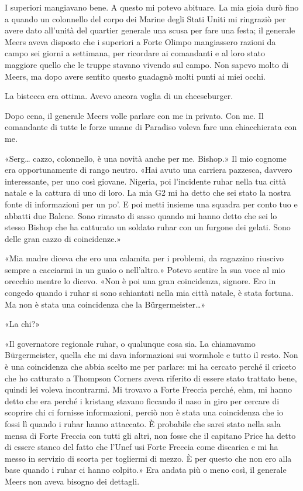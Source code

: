 I superiori mangiavano bene. A questo mi potevo abituare. La mia gioia
durò fino a quando un colonnello del corpo dei Marine degli Stati Uniti
mi ringraziò per avere dato all'unità del quartier generale una scusa
per fare una festa; il generale Meers aveva disposto che i superiori a
Forte Olimpo mangiassero razioni da campo sei giorni a settimana, per
ricordare ai comandanti e al loro stato maggiore quello che le truppe
stavano vivendo sul campo. Non sapevo molto di Meers, ma dopo avere
sentito questo guadagnò molti punti ai miei occhi.

La bistecca era ottima. Avevo ancora voglia di un cheeseburger.

\hfill\break

Dopo cena, il generale Meers volle parlare con me in privato. Con me. Il
comandante di tutte le forze umane di Paradiso voleva fare una
chiacchierata con me.

«Serg\ldots{} cazzo, colonnello, è una novità anche per me. Bishop.» Il
mio cognome era opportunamente di rango neutro. «Hai avuto una carriera
pazzesca, davvero interessante, per uno così giovane. Nigeria, poi
l'incidente ruhar nella tua città natale e la cattura di uno di loro. La
mia G2 mi ha detto che sei stato la nostra fonte di informazioni per un
po'. E poi metti insieme una squadra per conto tuo e abbatti due Balene.
Sono rimasto di sasso quando mi hanno detto che sei lo stesso Bishop che
ha catturato un soldato ruhar con un furgone dei gelati. Sono delle gran
cazzo di coincidenze.»

«Mia madre diceva che ero una calamita per i problemi, da ragazzino
riuscivo sempre a cacciarmi in un guaio o nell'altro.» Potevo sentire la
sua voce al mio orecchio mentre lo dicevo. «Non è poi una gran
coincidenza, signore. Ero in congedo quando i ruhar si sono schiantati
nella mia città natale, è stata fortuna. Ma non è stata una coincidenza
che la Bürgermeister\ldots»

«La chi?»

«Il governatore regionale ruhar, o qualunque cosa sia. La chiamavamo
Bürgermeister, quella che mi dava informazioni sui wormhole e tutto il
resto. Non è una coincidenza che abbia scelto me per parlare: mi ha
cercato perché il criceto che ho catturato a Thompson Corners aveva
riferito di essere stato trattato bene, quindi lei voleva incontrarmi.
Mi trovavo a Forte Freccia perché, ehm, mi hanno detto che era perché i
kristang stavano ficcando il naso in giro per cercare di scoprire chi ci
fornisse informazioni, perciò non è stata una coincidenza che io fossi
lì quando i ruhar hanno attaccato. È probabile che sarei stato nella
sala mensa di Forte Freccia con tutti gli altri, non fosse che il
capitano Price ha detto di essere stanco del fatto che l'Unef usi Forte
Freccia come discarica e mi ha messo in servizio di scorta per togliermi
di mezzo. È per questo che non ero alla base quando i ruhar ci hanno
colpito.» Era andata più o meno così, il generale Meers non aveva
bisogno dei dettagli.

